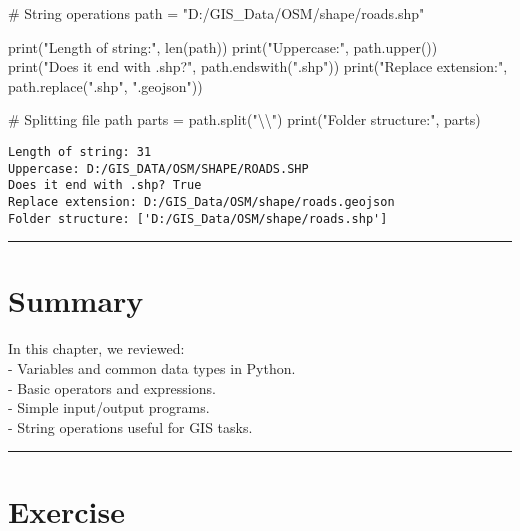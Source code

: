 \documentclass[
  11pt,
  letterpaper,
]{book}
\newenvironment{Shaded}{\begin{snugshade}}{\end{snugshade}}
\newcommand{\BuiltInTok}[1]{\textcolor[rgb]{0.00,0.23,0.31}{#1}}
\newcommand{\CharTok}[1]{\textcolor[rgb]{0.13,0.47,0.30}{#1}}
\newcommand{\CommentTok}[1]{\textcolor[rgb]{0.37,0.37,0.37}{#1}}
\newcommand{\NormalTok}[1]{\textcolor[rgb]{0.00,0.23,0.31}{#1}}
\newcommand{\OperatorTok}[1]{\textcolor[rgb]{0.37,0.37,0.37}{#1}}
\newcommand{\StringTok}[1]{\textcolor[rgb]{0.13,0.47,0.30}{#1}}
\begin{document}
\begin{Shaded}
\begin{Highlighting}[]
\CommentTok{\# String operations}
\NormalTok{path }\OperatorTok{=} \StringTok{"D:/GIS\_Data/OSM/shape/roads.shp"}

\BuiltInTok{print}\NormalTok{(}\StringTok{"Length of string:"}\NormalTok{, }\BuiltInTok{len}\NormalTok{(path))}
\BuiltInTok{print}\NormalTok{(}\StringTok{"Uppercase:"}\NormalTok{, path.upper())}
\BuiltInTok{print}\NormalTok{(}\StringTok{"Does it end with .shp?"}\NormalTok{, path.endswith(}\StringTok{".shp"}\NormalTok{))}
\BuiltInTok{print}\NormalTok{(}\StringTok{"Replace extension:"}\NormalTok{, path.replace(}\StringTok{".shp"}\NormalTok{, }\StringTok{".geojson"}\NormalTok{))}

\CommentTok{\# Splitting file path}
\NormalTok{parts }\OperatorTok{=}\NormalTok{ path.split(}\StringTok{"}\CharTok{\textbackslash{}\textbackslash{}}\StringTok{"}\NormalTok{)}
\BuiltInTok{print}\NormalTok{(}\StringTok{"Folder structure:"}\NormalTok{, parts)}
\end{Highlighting}
\end{Shaded}

\begin{verbatim}
Length of string: 31
Uppercase: D:/GIS_DATA/OSM/SHAPE/ROADS.SHP
Does it end with .shp? True
Replace extension: D:/GIS_Data/OSM/shape/roads.geojson
Folder structure: ['D:/GIS_Data/OSM/shape/roads.shp']
\end{verbatim}

\begin{center}\rule{0.5\linewidth}{0.5pt}\end{center}

\section{Summary}\label{summary-1}

In this chapter, we reviewed:\\
- Variables and common data types in Python.\\
- Basic operators and expressions.\\
- Simple input/output programs.\\
- String operations useful for GIS tasks.

\begin{center}\rule{0.5\linewidth}{0.5pt}\end{center}

\section{Exercise}\label{exercise-1}
\end{document}
